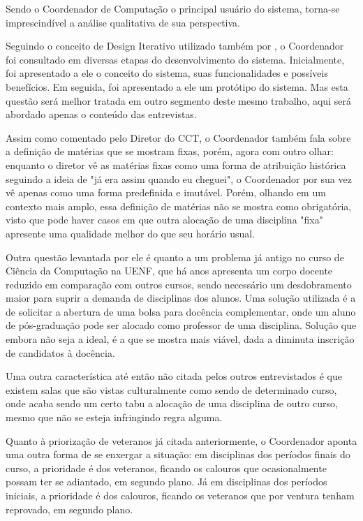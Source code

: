         Sendo o Coordenador de Computação o principal usuário do sistema, torna-se imprescindível a análise qualitativa de sua perspectiva.

        Seguindo o conceito de Design Iterativo utilizado também por \cite{andre_interaction_2018}, o Coordenador foi consultado em diversas etapas do desenvolvimento do sistema. Inicialmente, foi apresentado a ele o conceito do sistema, suas funcionalidades e possíveis benefícios. Em seguida, foi apresentado a ele um protótipo do sistema. Mas esta questão será melhor tratada em outro segmento deste mesmo trabalho, aqui será abordado apenas o conteúdo das entrevistas.

        Assim como comentado pelo Diretor do CCT, o Coordenador também fala sobre a definição de matérias que se mostram fixas, porém, agora com outro olhar: enquanto o diretor vê as matérias fixas como uma forma de atribuição histórica seguindo a ideia de "já era assim quando eu cheguei", o Coordenador por sua vez vê apenas como uma forma predefinida e imutável. Porém, olhando em um contexto mais amplo, essa definição de matérias não se mostra como obrigatória, visto que pode haver casos em que outra alocação de uma disciplina "fixa" apresente uma qualidade melhor do que seu horário usual.

        Outra questão levantada por ele é quanto a um problema já antigo no curso de Ciência da Computação na UENF, que há anos apresenta um corpo docente reduzido em comparação com outros cursos, sendo necessário um desdobramento maior para suprir a demanda de disciplinas dos alunos. Uma solução utilizada é a de solicitar a abertura de uma bolsa para docência complementar, onde um aluno de pós-graduação pode ser alocado como professor de uma disciplina. Solução que embora não seja a ideal, é a que se mostra mais viável, dada a diminuta inscrição de candidatos à docência.

        Uma outra característica até então não citada pelos outros entrevistados é que existem salas que são vistas culturalmente como sendo de determinado curso, onde acaba sendo um certo tabu a alocação de uma disciplina de outro curso, mesmo que não se esteja infringindo regra alguma.

        Quanto à priorização de veteranos já citada anteriormente, o Coordenador aponta uma outra forma de se enxergar a situação: em disciplinas dos períodos finais do curso, a prioridade é dos veteranos, ficando os calouros que ocasionalmente possam ter se adiantado, em segundo plano. Já em disciplinas dos períodos iniciais, a prioridade é dos calouros, ficando os veteranos que por ventura tenham reprovado, em segundo plano.

